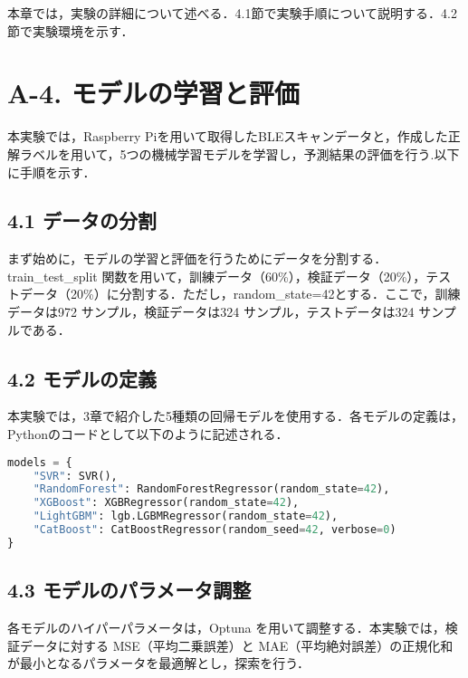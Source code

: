 本章では，実験の詳細について述べる．4.1節で実験手順について説明する．4.2節で実験環境を示す．

\section*{A-4. モデルの学習と評価}
本実験では，Raspberry Piを用いて取得したBLEスキャンデータと，作成した正解ラベルを用いて，5つの機械学習モデルを学習し，予測結果の評価を行う.以下に手順を示す．

\subsection*{4.1 データの分割}
まず始めに，モデルの学習と評価を行うためにデータを分割する．train\_test\_split 関数を用いて，訓練データ（60\%），検証データ（20\%），テストデータ（20\%）に分割する．ただし，random\_state=42とする．ここで，訓練データは972 サンプル，検証データは324 サンプル，テストデータは324 サンプルである．

\subsection*{4.2 モデルの定義}
本実験では，3章で紹介した5種類の回帰モデルを使用する．各モデルの定義は，Pythonのコードとして以下のように記述される．
\begin{lstlisting}[style=mystyle, language=Python, caption=回帰モデルの定義, label={models}]
models = {
    "SVR": SVR(),
    "RandomForest": RandomForestRegressor(random_state=42),
    "XGBoost": XGBRegressor(random_state=42),
    "LightGBM": lgb.LGBMRegressor(random_state=42),
    "CatBoost": CatBoostRegressor(random_seed=42, verbose=0)
}
\end{lstlisting}

\subsection*{4.3 モデルのパラメータ調整}
各モデルのハイパーパラメータは，Optuna を用いて調整する．本実験では，検証データに対する MSE（平均二乗誤差）と MAE（平均絶対誤差）の正規化和が最小となるパラメータを最適解とし，探索を行う．

